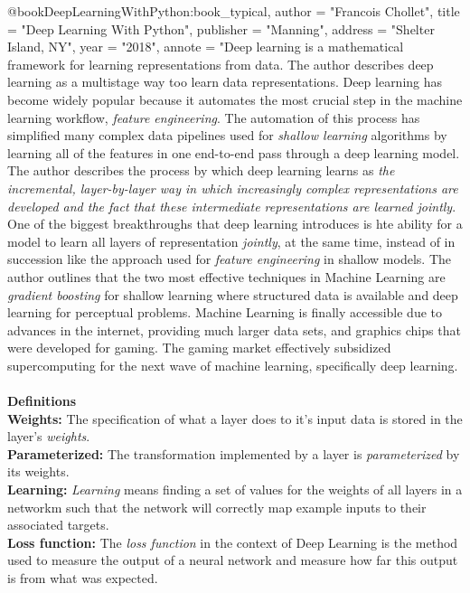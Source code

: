 

@book{DeepLearningWithPython:book_typical,
  author        = "Francois Chollet",
  title         = "Deep Learning With Python",
  publisher     = "Manning",
  address       = "Shelter Island, NY",
  year          = "2018",
  annote        = "Deep learning is a mathematical framework for learning representations from data. The author describes deep learning as a multistage way too learn data representations.
  Deep learning has become widely popular because it automates the most crucial step in the machine learning workflow, \emph{feature engineering}. The automation of this process has simplified
  many complex data pipelines used for \emph{shallow learning} algorithms by learning all of the features in one end-to-end pass through a deep learning model. The author describes the process by which
  deep learning learns as \emph{the incremental, layer-by-layer way in which increasingly complex representations are developed and the fact that these intermediate representations are learned jointly}.
  One of the biggest breakthroughs that deep learning introduces is hte ability for a model to learn all layers of representation \emph{jointly}, at the same time, instead of in succession like the approach used
  for \emph{feature engineering} in shallow models. The author outlines that the two most effective techniques in Machine Learning are \emph{gradient boosting} for shallow learning where structured data is available and 
  deep learning for perceptual problems. Machine Learning is finally accessible due to advances in the internet, providing much larger data sets, and graphics chips that were developed for gaming. The gaming market effectively
  subsidized supercomputing for the next wave of machine learning, specifically deep learning.
  \\
  \\ \textbf{Definitions}
  \\ \textbf{Weights:} The specification of what a layer does to it's input data is stored in the layer's \emph{weights}.
  \\ \textbf{Parameterized:} The transformation implemented by a layer is \emph{parameterized} by its weights.
  \\ \textbf{Learning:} \emph{Learning} means finding a set of values for the weights of all layers in a networkm such that the network will correctly map example inputs to their associated targets.
  \\ \textbf{Loss function:} The \emph{loss function} in the context of Deep Learning is the method used to measure the output of a neural network and measure how far this output is from what was expected.
}
